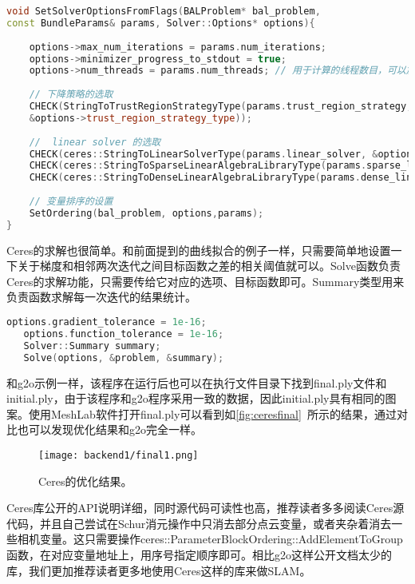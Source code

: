 \begin{lstlisting}[language=c++,caption=slambook/ch10/ceres_custombundle/ceresBundle.cpp（片段）]
void SetSolverOptionsFromFlags(BALProblem* bal_problem,
const BundleParams& params, Solver::Options* options){
	
	options->max_num_iterations = params.num_iterations;
	options->minimizer_progress_to_stdout = true;
	options->num_threads = params.num_threads; // 用于计算的线程数目，可以加速雅可比矩阵的计算
	
	// 下降策略的选取
	CHECK(StringToTrustRegionStrategyType(params.trust_region_strategy,
	&options->trust_region_strategy_type)); 
	
	//  linear solver 的选取
	CHECK(ceres::StringToLinearSolverType(params.linear_solver, &options->linear_solver_type));
	CHECK(ceres::StringToSparseLinearAlgebraLibraryType(params.sparse_linear_algebra_library, &options->sparse_linear_algebra_library_type));
	CHECK(ceres::StringToDenseLinearAlgebraLibraryType(params.dense_linear_algebra_library, &options->dense_linear_algebra_library_type));
	
	// 变量排序的设置
	SetOrdering(bal_problem, options,params);
}

\end{lstlisting}

Ceres的求解也很简单。和前面提到的曲线拟合的例子一样，只需要简单地设置一下关于梯度和相邻两次迭代之间目标函数之差的相关阈值就可以。Solve函数负责Ceres的求解功能，只需要传给它对应的选项、目标函数即可。Summary类型用来负责函数求解每一次迭代的结果统计。

\begin{lstlisting}[language=c++,caption=slambook/ch10/ceres_custombundle/ceresBundle.cpp（片段）]
   options.gradient_tolerance = 1e-16;
   options.function_tolerance = 1e-16;
   Solver::Summary summary;
   Solve(options, &problem, &summary);
\end{lstlisting}

和g2o示例一样，该程序在运行后也可以在执行文件目录下找到final.ply文件和initial.ply，由于该程序和g2o程序采用一致的数据，因此initial.ply具有相同的图案。使用MeshLab软件打开final.ply可以看到如\autoref{fig:ceresfinal}~所示的结果，通过对比也可以发现优化结果和g2o完全一样。

\begin{figure}[!ht]
	\centering
	\texttt{[image: backend1/final1.png]}
	\caption{Ceres的优化结果。}
	\label{fig:ceresfinal}
\end{figure}

Ceres库公开的API说明详细，同时源代码可读性也高，推荐读者多多阅读Ceres源代码，并且自己尝试在Schur消元操作中只消去部分点云变量，或者夹杂着消去一些相机变量。这只需要操作ceres::ParameterBlockOrdering::AddElementToGroup函数，在对应变量地址上，用序号指定顺序即可。相比g2o这样公开文档太少的库，我们更加推荐读者更多地使用Ceres这样的库来做SLAM。


